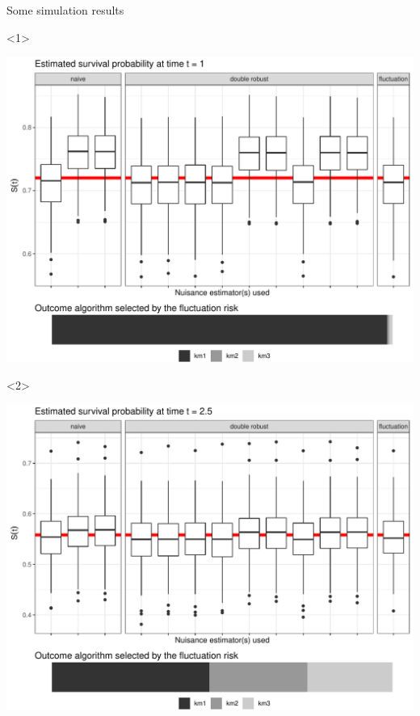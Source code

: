 \documentclass[smaller]{beamer}\usepackage{listings}
\begin{document}
\begin{frame}[label={sec:org20c68b1}]{Some simulation results}
\begin{onlyenv}<1>
\begin{center}
\includegraphics[width=.9\linewidth]{sim-results1.pdf}
\end{center}
\end{onlyenv}


\begin{onlyenv}<2>
\begin{center}
\includegraphics[width=.9\linewidth]{sim-results2.pdf}
\end{center}
\end{onlyenv}
\end{frame}
\end{document}
